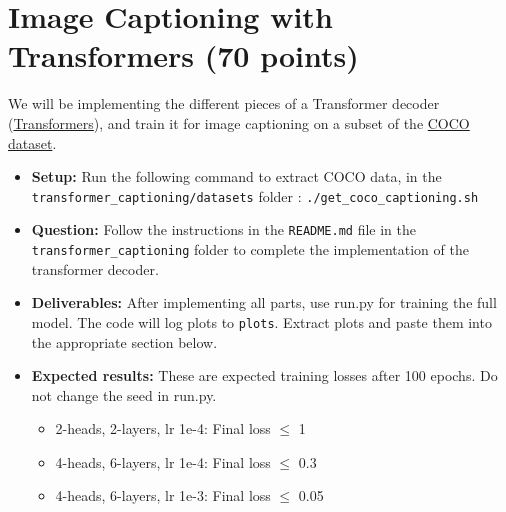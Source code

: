 \documentclass[11pt,addpoints,answers]{exam}
\numberwithin{equation}{section} %
\numberwithin{figure}{section} %
\numberwithin{table}{section} %
\begin{document}
\section{Image Captioning with Transformers (70 points)}



We will be implementing the different pieces of a Transformer decoder (\href{https://arxiv.org/pdf/1706.03762.pdf}{Transformers}), and train it for image captioning on a subset of the \href{https://cocodataset.org/#home}{COCO dataset}. 
\begin{itemize}
    \item \textbf{Setup:} Run the following command to extract COCO data, in the \texttt{transformer\_captioning/datasets} folder : \texttt{./get\_coco\_captioning.sh}
\item \textbf{Question:} Follow the instructions in the \texttt{README.md} file in the \texttt{transformer\_captioning} folder to complete the implementation of the transformer decoder.
\item \textbf{Deliverables:} After implementing all parts, use run.py for training the full model. The code will log plots to \texttt{plots}. Extract plots and paste them into the appropriate section below. 

\item \textbf{Expected results:}
    These are expected training losses after 100 epochs. Do not change the seed in run.py.
    \begin{itemize}
        \item 2-heads, 2-layers, lr 1e-4: Final loss $\leq$ 1 
        \item 4-heads, 6-layers, lr 1e-4: Final loss $\leq$ 0.3 
        \item 4-heads, 6-layers, lr 1e-3: Final loss $\leq$ 0.05
    \end{itemize}
\end{itemize}
\end{document}
